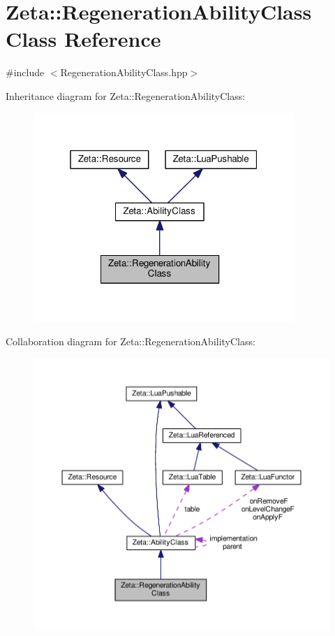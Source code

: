\hypertarget{classZeta_1_1RegenerationAbilityClass}{\section{Zeta\+:\+:Regeneration\+Ability\+Class Class Reference}
\label{classZeta_1_1RegenerationAbilityClass}
}


{\ttfamily \#include $<$Regeneration\+Ability\+Class.\+hpp$>$}



Inheritance diagram for Zeta\+:\+:Regeneration\+Ability\+Class\+:\nopagebreak
\begin{figure}[H]
\begin{center}
\leavevmode
\includegraphics[width=280pt]{classZeta_1_1RegenerationAbilityClass__inherit__graph}
\end{center}
\end{figure}


Collaboration diagram for Zeta\+:\+:Regeneration\+Ability\+Class\+:\nopagebreak
\begin{figure}[H]
\begin{center}
\leavevmode
\includegraphics[width=350pt]{classZeta_1_1RegenerationAbilityClass__coll__graph}
\end{center}
\end{figure}

